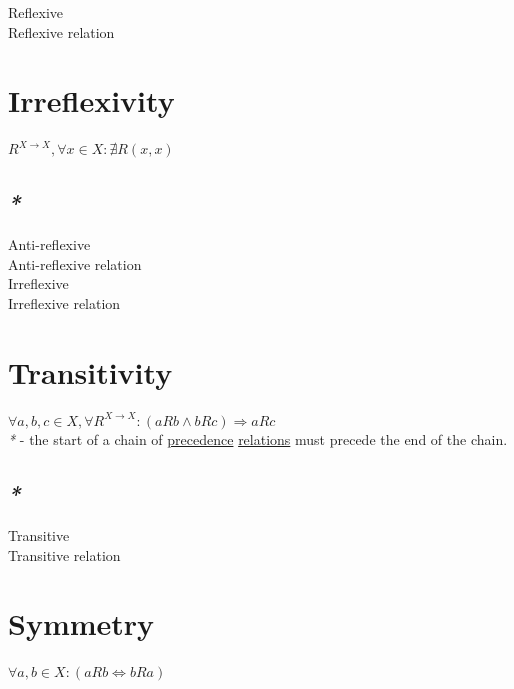 \documentclass[a4paper,14pt,oneside]{book}
\begin{document}
\label{org2e2e609}Reflexive\\
\label{orgd46b574}Reflexive relation\\

\section{\label{org83e707f}Irreflexivity}
\label{sec:org2c0a16f}

\(R^{X \to X}, \forall x \in X : \nexists R(x, x)\)\\

\subsection{\emph{*}}
\label{sec:org7cf543b}

\label{orgf0d77d6}Anti-reflexive\\
\label{org8a5373f}Anti-reflexive relation\\
\label{orgb45dd18}Irreflexive\\
\label{org5c405e2}Irreflexive relation\\

\section{\label{orgcd17408}Transitivity}
\label{sec:org242eded}

\(\forall a,b,c \in X, \forall R^{X \to X} : (aRb \land bRc) \Rightarrow aRc\)\\

\emph{*} - the start of a chain of \hyperref[org727d14d]{precedence} \hyperref[org7f47507]{relations} must precede the end of the chain.\\

\subsection{\emph{*}}
\label{sec:orge309c91}

\label{org055837d}Transitive\\
\label{orgf88d6bd}Transitive relation\\

\section{\label{org941d875}Symmetry}
\label{sec:org1be4f78}

\(\forall a,b \in X : (aRb \iff bRa)\)\\
\end{document}
